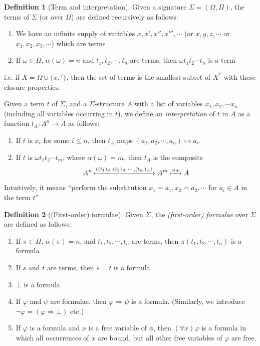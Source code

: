 \documentclass[a4paper]{article}
\theoremstyle{definition}
\newtheorem*{defi}{Definition}
\begin{document}
\begin{defi}[Term and interpretation]
  Given a signature $\Sigma=(\Omega, \Pi)$, the terms of $\Sigma$ (or over $\Omega$) are defined recursively as follows:
  \begin{enumerate}
  \item We have an infinite supply of variables $x, x', x'', x''', \cdots$ (or $x, y, z, \cdots$ or $x_1, x_2, x_3, \cdots$) which are terms
  \item If $\omega\in \Omega$, $\alpha(\omega) = n$ and $t_1, t_2, \cdots, t_n$ are terms, then $\omega t_1t_2\cdots t_n$ is a term
  \end{enumerate}
  i.e. if $X = \Omega\cup\{x, '\}$, then the set of terms is the smallest subset of $X^*$ with these closure properties.

  Given a term $t$ of $\Sigma$, and a $\Sigma$-structure $A$ with a list of variables $x_1, x_2,\cdots x_n$ (including all variables occurring in $t$), we define an \emph{interpretation} of $t$ in $A$ as a function $t_A: A^n\to A$ as follows:
  \begin{enumerate}
  \item If $t$ is $x_i$ for some $i\leq n$, then $t_A$ maps $(a_1, a_2, \cdots, a_n) \mapsto a_i$.
  \item If $t$ is $\omega t_1t_2\cdots t_m$, where $\alpha(\omega) = m$, then $t_A$ is the composite
$$A^n \xmapsto{((t_1)_A, (t_2)_A, \cdots, (t_m)_A)} A^m\xmapsto{\omega_A} A$$
  \end{enumerate}
  Intuitively, it means ``perform the substitution $x_1 = a_1, x_2 = a_2,\cdots$ for $a_i\in A$ in the term $t$''
\end{defi}

\begin{defi}[(First-order) formulae]
  Given $\Sigma$, the \emph{(first-order) formulae} over $\Sigma$ are defined as follows:
  \begin{enumerate}
  \item If $\pi \in \Pi$, $\alpha(\pi) = n$, and $t_1, t_2, \cdots, t_n$ are terms, then $\pi(t_1, t_2, \cdots, t_n)$ is a formula
  \item If $s$ and $t$ are terms, then $s = t$ is a formula
  \item $\bot$ is a formula
  \item If $\varphi$ and $\psi$ are formulae, then $\varphi \Rightarrow \psi$ is a formula. (Similarly, we introduce $\neg \varphi = (\varphi \Rightarrow \bot)$ etc.)
  \item If $\varphi$ is a formula and $x$ is a free variable of $\phi$, then $(\forall x)\varphi$ is a formula in which all occurrences of $x$ are bound, but all other free variables of $\varphi$ are free.
  \end{enumerate}
\end{defi}
\end{document}
